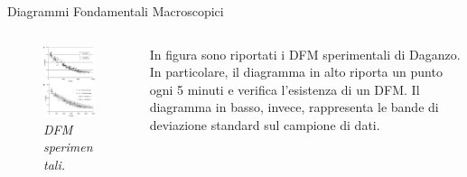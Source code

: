 \documentclass[
	11pt, %
]{beamer}
\begin{document}
\begin{frame}{Diagrammi Fondamentali Macroscopici}
	\begin{columns}[c]
		\begin{column}{.5\textwidth}
			\begin{figure}
				\includegraphics[width=.9\linewidth]{daganzo2.jpg}
				\caption{\emph{DFM sperimentali.}}
				\end{figure}		\end{column}
		\begin{column}{.5\textwidth}
			In figura sono riportati i DFM sperimentali di Daganzo.
			In particolare, il diagramma in alto riporta un punto ogni 5 minuti e verifica l'esistenza di un DFM.
			Il diagramma in basso, invece, rappresenta le bande di deviazione standard sul campione di dati.
		\end{column}	
	\end{columns}
\end{frame}
\end{document}
